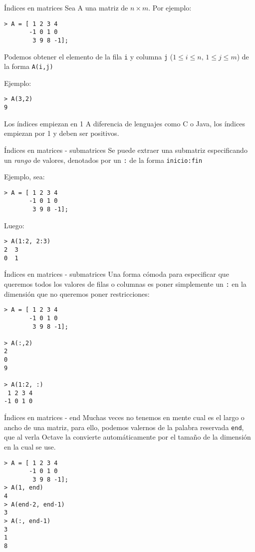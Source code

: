 \begin{frame}[fragile]{Índices en matrices}
Sea A una matriz de $n\times m$. Por ejemplo:

\begin{lstlisting}
> A = [ 1 2 3 4
       -1 0 1 0
        3 9 8 -1];
\end{lstlisting}

Podemos obtener el elemento de la fila \verb!i! y columna \verb!j! ($1\le i\le n, \, 1\le j\le m$) de la forma \verb!A(i,j)!

Ejemplo:
\begin{lstlisting}
> A(3,2)
9
\end{lstlisting}

\begin{alertblock}{Los índices empiezan en 1}
A diferencia de lenguajes como C o Java, los índices empiezan por 1 y deben ser positivos.
\end{alertblock}

\end{frame}

\begin{frame}[fragile]{Índices en matrices - submatrices}
Se puede extraer una submatriz especificando un \emph{rango} de valores, denotados por un \verb!:! de la forma \verb!inicio:fin!

Ejemplo, sea:
\begin{lstlisting}
> A = [ 1 2 3 4
       -1 0 1 0
        3 9 8 -1];
\end{lstlisting}

Luego:
\begin{lstlisting}
> A(1:2, 2:3)
2  3
0  1
\end{lstlisting}

\end{frame}

\begin{frame}[fragile]{Índices en matrices - submatrices}
Una forma cómoda para especificar que queremos todos los valores de filas o columnas es poner simplemente un \verb!:! en la dimensión que no queremos poner restricciones:

\begin{lstlisting}
> A = [ 1 2 3 4
       -1 0 1 0
        3 9 8 -1];

> A(:,2)
2
0
9

> A(1:2, :)
 1 2 3 4
-1 0 1 0
\end{lstlisting}

\end{frame}

\begin{frame}[fragile]{Índices en matrices - end}
Muchas veces no tenemos en mente cual es el largo o ancho de una matriz, para ello, podemos valernos de la palabra reservada \verb!end!, que al verla Octave la convierte automáticamente por el tamaño de la dimensión en la cual se use.

\begin{lstlisting}
> A = [ 1 2 3 4
       -1 0 1 0
        3 9 8 -1];
> A(1, end)
4
> A(end-2, end-1)
3
> A(:, end-1)
3
1
8
\end{lstlisting}
\end{frame}

